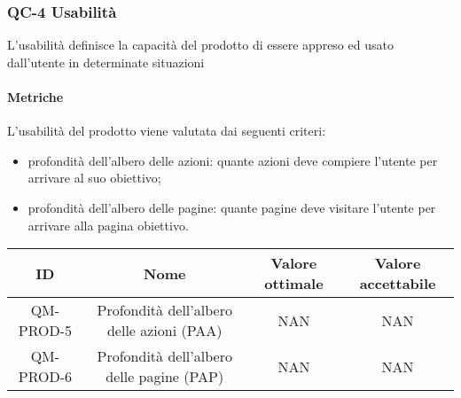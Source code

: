 \subsubsection{QC-4 Usabilità}
L'usabilità definisce la capacità del prodotto di essere appreso ed usato dall'utente in determinate situazioni
	
	\paragraph{Metriche}
	L'usabilità del prodotto viene valutata dai seguenti criteri:
	\begin{itemize}
		\item profondità dell'albero delle azioni: quante azioni deve compiere l'utente per arrivare al suo obiettivo;
		\item profondità dell'albero delle pagine: quante pagine deve visitare l'utente per arrivare alla pagina obiettivo.
	\end{itemize}
	\begin{center}
		\begin{tabular}{|c|c|c|c|}
			\rowcolor{lighter-grayer}
			\hline
			ID & Nome & Valore ottimale & Valore accettabile \\
			\hline
			QM-PROD-5 & Profondità dell'albero delle azioni (PAA) & NAN & NAN \\
			\hline
			QM-PROD-6 & Profondità dell'albero delle pagine (PAP) & NAN & NAN \\
			\hline
		\end{tabular}
	\end{center}
